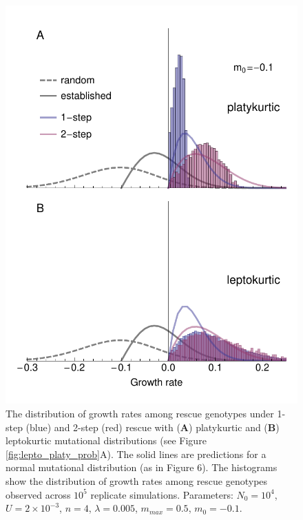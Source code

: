 \documentclass[9pt,twocolumn,twoside]{../main/gsajnl}
\begin{document}
\begin{figure}[htbp]
\centering
\includegraphics[width=\linewidth]{FigureS4.pdf}
\caption{
The distribution of growth rates among rescue genotypes under 1-step (blue) and 2-step (red) rescue with (\textbf{A}) platykurtic and (\textbf{B}) leptokurtic mutational distributions (see Figure \ref{fig:lepto_platy_prob}A).
The solid lines are predictions for a normal mutational distribution (as in Figure 6).
The histograms show the distribution of growth rates among rescue genotypes observed across $10^5$ replicate simulations.
Parameters: $N_0=10^4$, $U=2\times 10^{-3}$, $n=4$, $\lambda=0.005$, $m_{max}=0.5$, $m_0=-0.1$.
}%
\label{fig:lepto_platy_dfe}
\end{figure}
\end{document}
